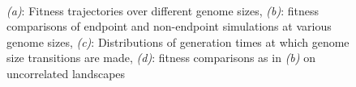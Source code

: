 \documentclass[paper=a4, fontsize=11pt,twoside]{scrartcl}       %
\begin{document}
\begin{figure}[h!]
        \centering                                                                                                                                                  
         \\                                                                                                       \caption{\textit{(a)}: Fitness trajectories over different genome sizes, \textit{(b)}: fitness comparisons of endpoint and non-endpoint simulations at various genome sizes, \textit{(c)}: Distributions of generation times at which genome size transitions are made, \textit{(d)}: fitness comparisons as in \textit{(b)} on uncorrelated landscapes}
        \label{intermediate_epistasis}
\end{figure}
\end{document}
